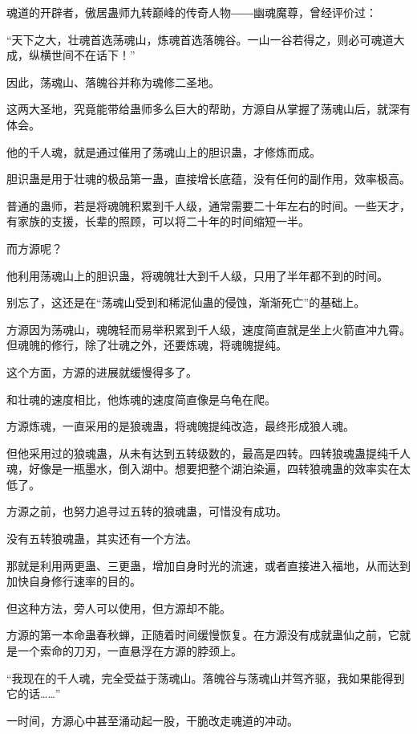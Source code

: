 
\begin{this_body}

魂道的开辟者，傲居蛊师九转巅峰的传奇人物――幽魂魔尊，曾经评价过：

“天下之大，壮魂首选荡魂山，炼魂首选落魄谷。一山一谷若得之，则必可魂道大成，纵横世间不在话下！”

因此，荡魂山、落魄谷并称为魂修二圣地。

这两大圣地，究竟能带给蛊师多么巨大的帮助，方源自从掌握了荡魂山后，就深有体会。

他的千人魂，就是通过催用了荡魂山上的胆识蛊，才修炼而成。

胆识蛊是用于壮魂的极品第一蛊，直接增长底蕴，没有任何的副作用，效率极高。

普通的蛊师，若是将魂魄积累到千人级，通常需要二十年左右的时间。一些天才，有家族的支援，长辈的照顾，可以将二十年的时间缩短一半。

而方源呢？

他利用荡魂山上的胆识蛊，将魂魄壮大到千人级，只用了半年都不到的时间。

别忘了，这还是在“荡魂山受到和稀泥仙蛊的侵蚀，渐渐死亡”的基础上。

方源因为荡魂山，魂魄轻而易举积累到千人级，速度简直就是坐上火箭直冲九霄。但魂魄的修行，除了壮魂之外，还要炼魂，将魂魄提纯。

这个方面，方源的进展就缓慢得多了。

和壮魂的速度相比，他炼魂的速度简直像是乌龟在爬。

方源炼魂，一直采用的是狼魂蛊，将魂魄提纯改造，最终形成狼人魂。

但他采用过的狼魂蛊，从未有达到五转级数的，最高是四转。四转狼魂蛊提纯千人魂，好像是一瓶墨水，倒入湖中。想要把整个湖泊染遍，四转狼魂蛊的效率实在太低了。

方源之前，也努力追寻过五转的狼魂蛊，可惜没有成功。

没有五转狼魂蛊，其实还有一个方法。

那就是利用两更蛊、三更蛊，增加自身时光的流速，或者直接进入福地，从而达到加快自身修行速率的目的。

但这种方法，旁人可以使用，但方源却不能。

方源的第一本命蛊春秋蝉，正随着时间缓慢恢复。在方源没有成就蛊仙之前，它就是一个索命的刀刃，一直悬浮在方源的脖颈上。

“我现在的千人魂，完全受益于荡魂山。落魄谷与荡魂山并驾齐驱，我如果能得到它的话……”

一时间，方源心中甚至涌动起一股，干脆改走魂道的冲动。


\end{this_body}
